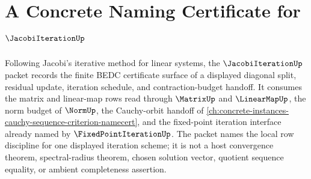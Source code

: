 \chapter{A Concrete Naming Certificate for $\JacobiIterationUp$}
\label{ch:concrete-instances-jacobi-iteration-namecert}

Following Jacobi's iterative method for linear systems, the $\JacobiIterationUp$ packet records the finite BEDC certificate surface of a displayed diagonal split, residual update, iteration schedule, and contraction-budget handoff. It consumes the matrix and linear-map rows read through $\MatrixUp$ and $\LinearMapUp$, the norm budget of $\NormUp$, the Cauchy-orbit handoff of \autoref{ch:concrete-instances-cauchy-sequence-criterion-namecert}, and the fixed-point iteration interface already named by $\FixedPointIterationUp$. The packet names the local row discipline for one displayed iteration scheme; it is not a host convergence theorem, spectral-radius theorem, chosen solution vector, quotient sequence equality, or ambient completeness assertion.

